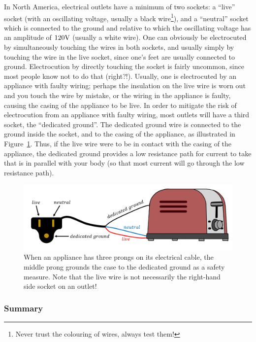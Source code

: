 In North America, electrical outlets have a minimum of two sockets: a ``live'' socket (with an oscillating voltage, usually a black wire\footnote{Never trust the colouring of wires, always test them!}), and a ``neutral'' socket which is connected to the ground and relative to which the oscillating voltage has an amplitude of $120 {\rm V}$ (usually a white wire). One can obviously be electrocuted by simultaneously touching the wires in both sockets, and usually simply by touching the wire in the live socket, since one's feet are usually connected to ground. Electrocution by directly touching the socket is fairly uncommon, since most people know not to do that (right?!). Usually, one is electrocuted by an appliance with faulty wiring; perhaps the insulation on the live wire is worn out and you touch the wire by mistake, or the wiring in the appliance is faulty, causing the casing of the appliance to be live. In order to mitigate the risk of electrocution from an appliance with faulty wiring, most outlets will have a third socket, the ``dedicated ground''. The dedicated ground wire is connected to the ground inside the socket, and to the casing of the appliance, as illustrated in Figure~\ref{fig:current:toaster}. Thus, if the live wire were to be in contact with the casing of the appliance, the dedicated ground provides a low resistance path for current to take that is in parallel with your body (so that most current will go through the low resistance path).

\begin{figure}[!htbp]
\centering
\includegraphics[width=1\linewidth]{files/toaster-1f623c53aaf6f4b9b0a91566c6ecca0d.png}
\caption[]{When an appliance has three prongs on its electrical cable, the middle prong grounds the case to the dedicated ground as a safety measure. Note that the live wire is not necessarily the right-hand side socket on an outlet!}
\label{fig:current:toaster}
\end{figure}

\subsubsection{Summary}


